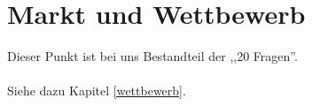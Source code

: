 \chapter{Markt und Wettbewerb}
Dieser Punkt ist bei uns Bestandteil der ,,20 Fragen''.
\\
\\
Siehe dazu Kapitel \ref{wettbewerb}.
